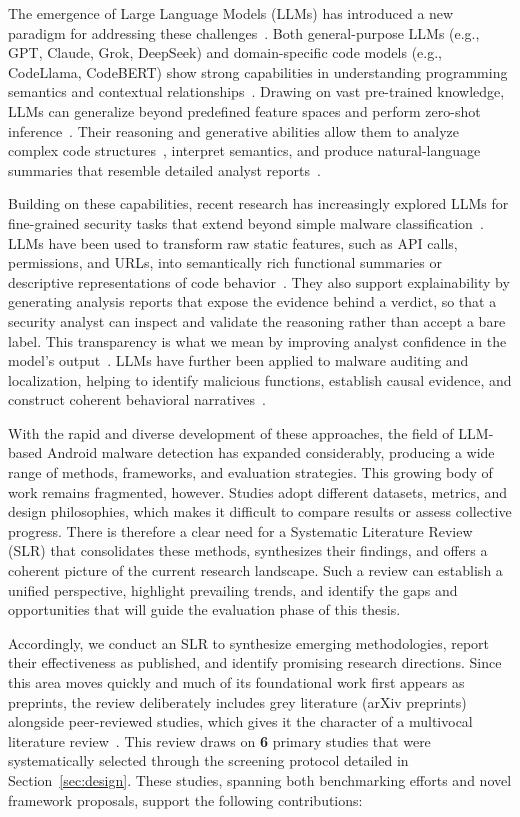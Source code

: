 The emergence of Large Language Models (LLMs) has introduced a new paradigm for addressing these challenges~\cite{alkaraki2024exploring}. Both general-purpose LLMs (e.g., GPT, Claude, Grok, DeepSeek) and domain-specific code models (e.g., CodeLlama, CodeBERT) show strong capabilities in understanding programming semantics and contextual relationships~\cite{Ruellan2025}. Drawing on vast pre-trained knowledge, LLMs can generalize beyond predefined feature spaces and perform zero-shot inference~\cite{Qian2025-ua}. Their reasoning and generative abilities allow them to analyze complex code structures~\cite{Dong2025}, interpret semantics, and produce natural-language summaries that resemble detailed analyst reports~\cite{He2025-ma}.

Building on these capabilities, recent research has increasingly explored LLMs for fine-grained security tasks that extend beyond simple malware classification~\cite{Zheng2025-no}. LLMs have been used to transform raw static features, such as API calls, permissions, and URLs, into semantically rich functional summaries or descriptive representations of code behavior~\cite{Zhao2024-dw,Shota,Wu2025}. They also support explainability by generating analysis reports that expose the evidence behind a verdict, so that a security analyst can inspect and validate the reasoning rather than accept a bare label. This transparency is what we mean by improving analyst confidence in the model's output~\cite{Li2024-wl,Zhang2025-ot}. LLMs have further been applied to malware auditing and localization, helping to identify malicious functions, establish causal evidence, and construct coherent behavioral narratives~\cite{Zheng2025-no}.

With the rapid and diverse development of these approaches, the field of LLM-based Android malware detection has expanded considerably, producing a wide range of methods, frameworks, and evaluation strategies. This growing body of work remains fragmented, however. Studies adopt different datasets, metrics, and design philosophies, which makes it difficult to compare results or assess collective progress. There is therefore a clear need for a Systematic Literature Review (SLR) that consolidates these methods, synthesizes their findings, and offers a coherent picture of the current research landscape. Such a review can establish a unified perspective, highlight prevailing trends, and identify the gaps and opportunities that will guide the evaluation phase of this thesis.

Accordingly, we conduct an SLR to synthesize emerging methodologies, report their effectiveness as published, and identify promising research directions. Since this area moves quickly and much of its foundational work first appears as preprints, the review deliberately includes grey literature (arXiv preprints) alongside peer-reviewed studies, which gives it the character of a multivocal literature review~\cite{garousi2019mlr}. This review draws on \textbf{6} primary studies that were systematically selected through the screening protocol detailed in Section~\ref{sec:design}. These studies, spanning both benchmarking efforts and novel framework proposals, support the following contributions:


